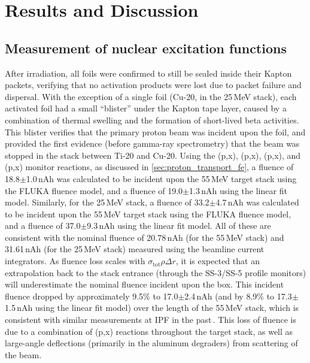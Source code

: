 \section{\label{sec:results_fe}Results and Discussion}


\subsection{Measurement of nuclear excitation functions}

After irradiation, all foils were confirmed to still be sealed inside their Kapton packets, verifying that no activation products were lost due to packet failure and dispersal.
With the exception of a single foil (Cu-20, in the 25\,MeV stack), each activated foil had a small \enquote{blister} under the Kapton tape layer, caused by a combination of thermal swelling and the formation of short-lived beta activities.
This blister   verifies that the primary proton beam was incident upon the foil, and provided the first evidence (before gamma-ray spectrometry) that the beam was stopped in the stack between Ti-20 and Cu-20.
Using the (p,x), (p,x), (p,x), and (p,x) monitor reactions, as discussed in \autoref{sec:proton_transport_fe}, a fluence of 18.8$\pm$1.0\,nAh was calculated to be incident upon the 55\,MeV target stack using the FLUKA fluence model, and a  fluence of 19.0$\pm$1.3\,nAh using the linear fit model.
Similarly, for the 25\,MeV stack, a fluence of 33.2$\pm$4.7\,nAh was calculated to be incident upon the 55\,MeV target stack using the FLUKA fluence model, and a  fluence of 37.0$\pm$9.3\,nAh using the linear fit model.
All of these are consistent with the nominal fluence of 20.78\,nAh (for the 55\,MeV stack) and 31.61\,nAh (for the 25\,MeV stack) measured using the beamline current integrators.
As fluence loss scales with $\sigma_{\mathrm{tot}}\rho\Delta r$, it is expected that an extrapolation back to the stack entrance (through the SS-3/SS-5 profile monitors) will underestimate the nominal fluence incident upon the box.
This incident fluence dropped by approximately 9.5\% to  17.0$\pm$2.4\,nAh (and by 8.9\% to  17.3$\pm$1.5\,nAh using the linear fit model) over the length of the 55\,MeV stack, which is consistent with similar measurements at IPF in the past\,\cite{Voyles2018a,Graves2016}.
This loss of fluence is due to a combination of 
(p,x) reactions throughout the target stack, as well as large-angle deflections (primarily in the aluminum degraders) from scattering of the beam.




